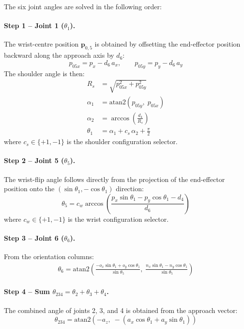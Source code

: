 The six joint angles are solved in the following order:

\paragraph{Step 1 -- Joint 1 ($\theta_1$).}
The wrist-centre position $\mathbf{p}_{0,5}$ is obtained by offsetting the end-effector position backward along the approach axis by $d_6$:
\begin{equation}
  p_{05x} = p_x - d_6\,a_x, \qquad p_{05y} = p_y - d_6\,a_y
\end{equation}
The shoulder angle is then:
\begin{align}
  R_s    &= \sqrt{p_{05x}^2 + p_{05y}^2} \\
  \alpha_1 &= \mathrm{atan2}(p_{05y},\;p_{05x}) \\
  \alpha_2 &= \arccos\!\left(\frac{d_4}{R_s}\right) \\
  \theta_1 &= \alpha_1 + c_s\,\alpha_2 + \frac{\pi}{2}
\end{align}
where $c_s \in \{+1, -1\}$ is the shoulder configuration selector.

\paragraph{Step 2 -- Joint 5 ($\theta_5$).}
The wrist-flip angle follows directly from the projection of the end-effector position onto the $(\sin\theta_1, -\cos\theta_1)$ direction:
\begin{equation}
  \theta_5 = c_w \arccos\!\left(\frac{p_x\sin\theta_1 - p_y\cos\theta_1 - d_4}{d_6}\right)
\end{equation}
where $c_w \in \{+1,-1\}$ is the wrist configuration selector.

\paragraph{Step 3 -- Joint 6 ($\theta_6$).}
From the orientation columns:
\begin{align}
  \theta_6 = \mathrm{atan2}\!\left(
    \frac{-o_x\sin\theta_1 + o_y\cos\theta_1}{\sin\theta_5},\;
    \frac{n_x\sin\theta_1 - n_y\cos\theta_1}{\sin\theta_5}
  \right)
\end{align}

\paragraph{Step 4 -- Sum $\theta_{234} = \theta_2 + \theta_3 + \theta_4$.}
The combined angle of joints 2, 3, and 4 is obtained from the approach vector:
\begin{equation}
  \theta_{234} = \mathrm{atan2}\!\left(-a_z,\;-(a_x\cos\theta_1 + a_y\sin\theta_1)\right)
\end{equation}

